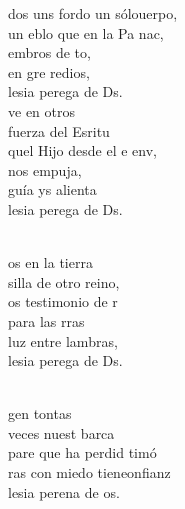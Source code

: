 \begin{cancion}%
	dos uns fordo un sólouerpo,\\
	un eblo que en la Pa nac,\\
	embros de to,\\
	en gre redios,\\
	lesia perega de Ds.\\
\jump
	ve en otros\\
	fuerza del Esritu \\
	quel Hijo desde el e env,\\
	 nos empuja,\\
	guía ys alienta\\
	lesia perega de Ds.\\\jump\\
	\begin{chorus}%
	os en la tierra \\
	silla de otro reino,\\
	os testimonio de r\\
	 para las rras\\
	luz entre lambras,\\
	lesia perega de Ds.\\
	\end{chorus}%
	\jump\\
	gen tontas \\
	 veces nuest barca\\
	pare que ha perdid timó\\
	ras con miedo tieneonfianz\\
	lesia perena de os.\\

\end{cancion}
